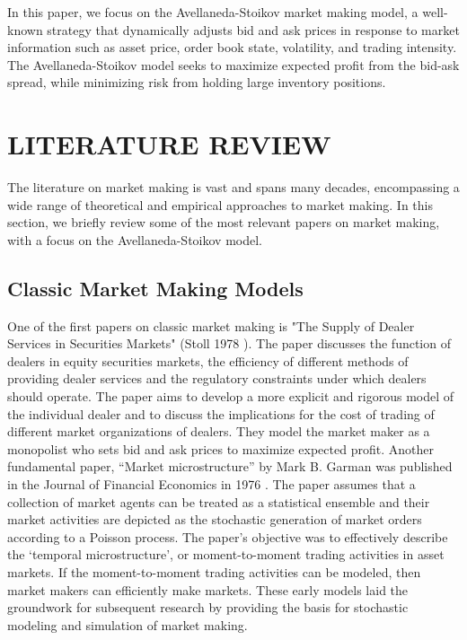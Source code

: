 \documentclass[letterpaper, 10 pt, conference]{ieeeconf}  %
\begin{document}
In this paper, we focus on the Avellaneda-Stoikov market making model, a well-known strategy that dynamically adjusts bid and ask prices in response to market information such as asset price, order book state, volatility, and trading intensity. The Avellaneda-Stoikov model seeks to maximize expected profit from the bid-ask spread, while minimizing risk from holding large inventory positions. 


\section{LITERATURE REVIEW}

The literature on market making is vast and spans many decades, encompassing a wide range of theoretical and empirical approaches to market making. In this section, we briefly review some of the most relevant papers on market making, with a focus on the Avellaneda-Stoikov model.

\subsection{Classic Market Making Models}
One of the first papers on classic market making is "The Supply of Dealer Services in Securities Markets" (Stoll 1978 \cite{c1}). The paper discusses the function of dealers in equity securities markets, the efficiency of different methods of providing dealer services and the regulatory constraints under which dealers should operate. The paper aims to develop a more explicit and rigorous model of the individual dealer and to discuss the implications for the cost of trading of different market organizations of dealers. They model the market maker as a monopolist who sets bid and ask prices to maximize expected profit.
Another fundamental paper, “Market microstructure” by Mark B. Garman was published in the Journal of Financial Economics in 1976 \cite{c2}. The paper assumes that a collection of market agents can be treated as a statistical ensemble and their market activities are depicted as the stochastic generation of market orders according to a Poisson process. The paper's objective was to effectively describe the ‘temporal microstructure’, or moment-to-moment trading activities in asset markets. If the moment-to-moment trading activities can be modeled, then market makers can efficiently make markets. These early models laid the groundwork for subsequent research by providing the basis for stochastic modeling and simulation of market making. 
\end{document}
